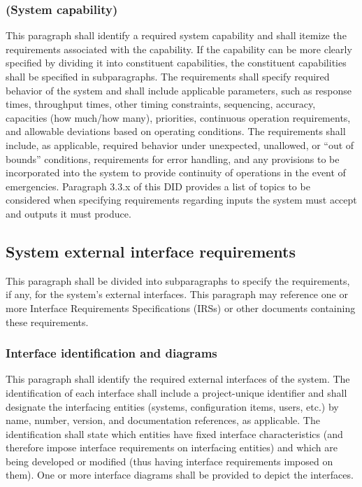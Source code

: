 \documentclass{fidata-report-template}
\begin{document}
\subsubsection{(System capability)}

This paragraph shall identify a required system capability and shall
itemize the requirements associated with the capability. If the
capability can be more clearly specified by dividing it into constituent
capabilities, the constituent capabilities shall be specified in
subparagraphs. The requirements shall specify required behavior of the
system and shall include applicable parameters, such as response times,
throughput times, other timing constraints, sequencing, accuracy,
capacities (how much/how many), priorities, continuous operation
requirements, and allowable deviations based on operating conditions.
The requirements shall include, as applicable, required behavior under
unexpected, unallowed, or ``out of bounds'' conditions, requirements for
error handling, and any provisions to be incorporated into the system to
provide continuity of operations in the event of emergencies. Paragraph
3.3.x of this DID provides a list of topics to be considered when
specifying requirements regarding inputs the system must accept and
outputs it must produce.

\subsection{System external interface requirements}

This paragraph shall be divided into subparagraphs to specify the
requirements, if any, for the system's external interfaces. This
paragraph may reference one or more Interface Requirements
Specifications (IRSs) or other documents containing these requirements.

\subsubsection{Interface identification and diagrams}

This paragraph shall identify the required external interfaces of the
system. The identification of each interface shall include a
project-unique identifier and shall designate the interfacing entities
(systems, configuration items, users, etc.) by name, number, version,
and documentation references, as applicable. The identification shall
state which entities have fixed interface characteristics (and therefore
impose interface requirements on interfacing entities) and which are
being developed or modified (thus having interface requirements imposed
on them). One or more interface diagrams shall be provided to depict the
interfaces.
\end{document}
